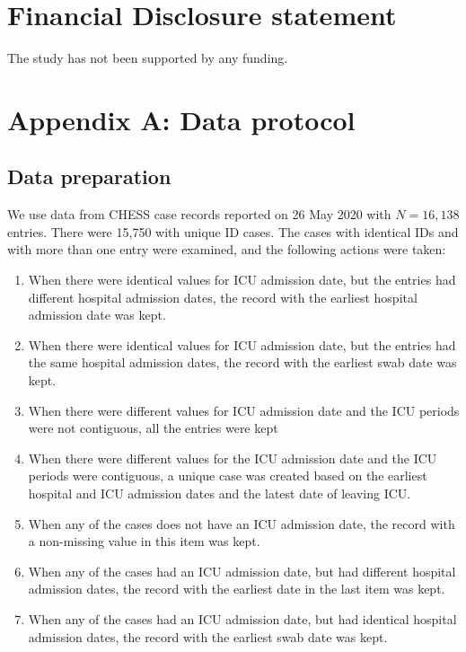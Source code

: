\documentclass[review]{elsarticle}
\begin{document}
\section*{Financial Disclosure statement}
The study has not been supported by any funding.


\newpage 

\appendix
\section{Appendix A: Data protocol}
\label{appendix:A} 

\subsection{Data preparation}

We use data from CHESS case records reported on 26 May 2020 with $N = 16,138$ entries. There were 15,750 with unique ID cases. The cases with identical IDs and with more than one entry were examined, and the following actions were taken:

\begin{enumerate}
\item When there were identical values for ICU admission date, but the entries had different hospital admission dates, the record with the earliest hospital admission date was kept.
\item When there were identical values for ICU admission date, but the entries had the same hospital admission dates, the record with the earliest swab date was kept.
\item When there were different values for ICU admission date and the ICU periods were not contiguous, all the entries were kept
\item When there were different values for the ICU admission date and the ICU periods were contiguous, a unique case was created based on the earliest hospital and ICU admission dates and the latest date of leaving ICU.
\item When any of the cases does not have an ICU admission date, the record with a non-missing value in this item was kept.
\item When any of the cases had an ICU admission date, but had different hospital admission dates, the record with the earliest date in the last item was kept.
\item When any of the cases had an ICU admission date, but had identical hospital admission dates, the record with the earliest swab date was kept.
 \end{enumerate}
\end{document}
